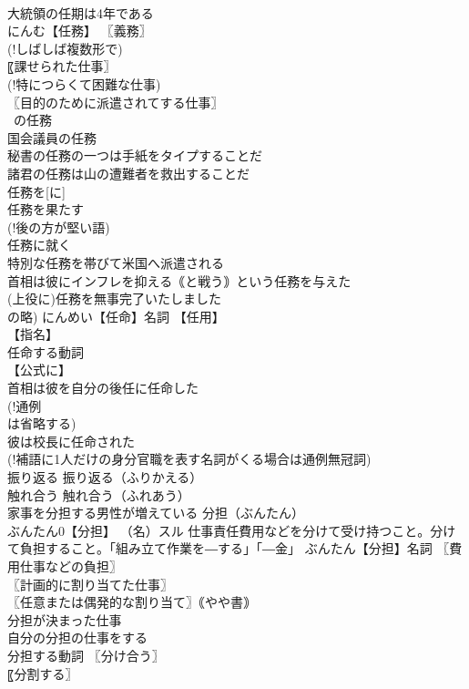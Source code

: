 \documentclass[8pt]{extreport}
\begin{document}
\begin{CJK}{UTF8}{min}
\\	大統領の任期は4年である 
\\	にんむ【任務】 〖義務〗
\\	(!しばしば複数形で) 
\\	〖課せられた仕事〗
\\	(!特につらくて困難な仕事) 
\\	〖目的のために派遣されてする仕事〗
\\	~の任務 
\\	国会議員の任務 
\\	秘書の任務の一つは手紙をタイプすることだ 
\\	諸君の任務は山の遭難者を救出することだ 
\\	任務を[に] 
\\	任務を果たす 
\\	(!後の方が堅い語) 
\\	任務に就く 
\\	特別な任務を帯びて米国へ派遣される 
\\	首相は彼にインフレを抑える｟と戦う｠という任務を与えた 
\\	(上役に)任務を無事完了いたしました 
\\	の略) にんめい【任命】名詞 【任用】
\\	【指名】
\\	任命する動詞 
\\	【公式に】
\\	首相は彼を自分の後任に任命した 
\\	(!通例 
\\	は省略する) 
\\	彼は校長に任命された 
\\	(!補語に1人だけの身分官職を表す名詞がくる場合は通例無冠詞) 
\\	振り返る		振り返る（ふりかえる） 
\\	触れ合う		触れ合う（ふれあう） 
\\	家事を分担する男性が増えている		分担（ぶんたん） 
\\	ぶんたん0【分担】 （名）スル 仕事責任費用などを分けて受け持つこと。分けて負担すること。「組み立て作業を―する」「―金」 ぶんたん【分担】名詞 〖費用仕事などの負担〗
\\	〖計画的に割り当てた仕事〗
\\	〖任意または偶発的な割り当て〗｟やや書｠
\\	分担が決まった仕事 
\\	自分の分担の仕事をする 
\\	分担する動詞 〖分け合う〗
\\	〖分割する〗

\end{CJK}
\end{document}
